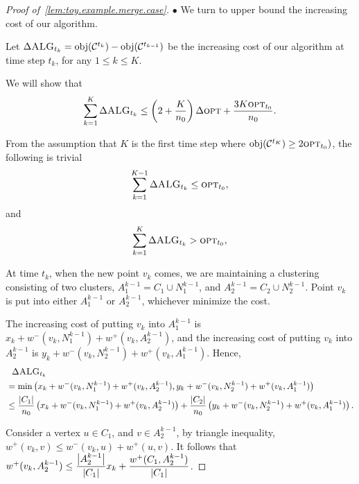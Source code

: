 \begin{proof}[Proof of~\cref{lem:toy.example.merge.case}]
    $ \bullet $ We turn to upper bound the increasing cost of our algorithm.

    Let $ \Delta\textsc{ALG}_{t_{k}} = \text{obj}(\mathcal{C}^{t_{k}}) - \text{obj}(\mathcal{C}^{t_{k-1}}) $ be the increasing cost of our algorithm at time step $ t_{k} $, for any $ 1\leq k \leq K $.

    We will show that
    \begin{align}
        \sum_{k=1}^{K}\Delta \textsc{ALG}_{t_{k}} \leq \left(2+\dfrac{K}{n_0}\right)\Delta\textsc{opt} + \dfrac{3K\textsc{opt}_{t_0}}{n_0}.\label{eq.upper.Delta.alg}
    \end{align}

    From the assumption that $ K $ is the first time step where $ \text{obj}( \mathcal{C}^{t_{K}} )\geq 2\textsc{opt}_{t_0} ) $, the following is trivial
    \begin{align}
        \sum_{k=1}^{K-1}\Delta\textsc{ALG}_{t_{k}} \leq \textsc{opt}_{t_0} ,\label{eq.upper.all.Delta.alg}
    \end{align}
    and
    \begin{align}
        \sum_{k=1}^{K}\Delta\textsc{ALG}_{t_{k}} > \textsc{opt}_{t_0} ,\label{eq.upper.all.Delta.alg}
    \end{align}

    At time $ t_{k} $, when the new point $ v_{k} $ comes, we are maintaining a clustering consisting of two clusters, $ A_{1}^{k-1} = C_{1}\cup N^{k-1}_{1} $, and $ A_{2}^{k-1} = C_{2}\cup N^{k-1}_{2} $.
    Point $ v_{k} $ is put into either $ A_{1}^{k-1} $ or $ A_{2}^{k-1} $, whichever minimize the cost.

    The increasing cost of putting $ v_{k} $ into $ A_{1}^{k-1} $ is $ x_{k} + w^{-}(v_{k}, N^{k-1}_{1}) + w^{+}(v_{k}, A_{2}^{k-1}) $, and the increasing cost of putting $ v_{k} $ into $ A_{2}^{k-1} $ is $ y_{k} + w^{-}(v_{k}, N^{k-1}_{2}) + w^{+}(v_{k}, A_{1}^{k-1}) $.
    Hence,
    \begin{align}
        &\>\>\>\Delta \textsc{ALG}_{t_{k}}  \nonumber \\
        &= \min\left( x_{k} + w^{-}(v_{k}, N^{k-1}_{1}) + w^{+}(v_{k}, A_{2}^{k-1}) ,  y_{k} + w^{-}(v_{k}, N^{k-1}_{2}) + w^{+}(v_{k}, A_{1}^{k-1}) \right) \nonumber \\
                            &\leq \dfrac{\left| C_{1} \right|}{n_0}\left(x_{k} + w^{-}(v_{k}, N^{k-1}_{1}) + w^{+}(v_{k}, A_{2}^{k-1})\right) + \dfrac{\left| C_{2} \right|}{n_0}\left(y_{k} + w^{-}(v_{k}, N^{k-1}_{2}) + w^{+}(v_{k}, A_{1}^{k-1})\right). \label{eq.convex.comb.of.two.choices}
    \end{align}

    Consider a vertex $ u\in C_{1} $, and $ v \in A_{2}^{k-1} $, by triangle inequality, $ w^{+}(v_{k}, v) \leq w^{-}(v_{k},u) + w^{+}(u,v) $.
    It follows that $ w^{+}(v_{k}, A_{2}^{k-1}) \leq \dfrac{\left| A_{2}^{k-1} \right|}{\left| C_{1} \right|}x_{k} + \dfrac{w^{+}(C_{1}, A_{2}^{k-1})}{\left| C_{1} \right|} $.


\end{proof}
